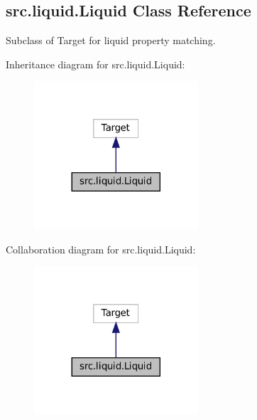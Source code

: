 \hypertarget{classsrc_1_1liquid_1_1Liquid}{}\subsection{src.\+liquid.\+Liquid Class Reference}
\label{classsrc_1_1liquid_1_1Liquid}


Subclass of Target for liquid property matching.  




Inheritance diagram for src.\+liquid.\+Liquid\+:
\nopagebreak
\begin{figure}[H]
\begin{center}
\leavevmode
\includegraphics[width=173pt]{classsrc_1_1liquid_1_1Liquid__inherit__graph}
\end{center}
\end{figure}


Collaboration diagram for src.\+liquid.\+Liquid\+:
\nopagebreak
\begin{figure}[H]
\begin{center}
\leavevmode
\includegraphics[width=173pt]{classsrc_1_1liquid_1_1Liquid__coll__graph}
\end{center}
\end{figure}
